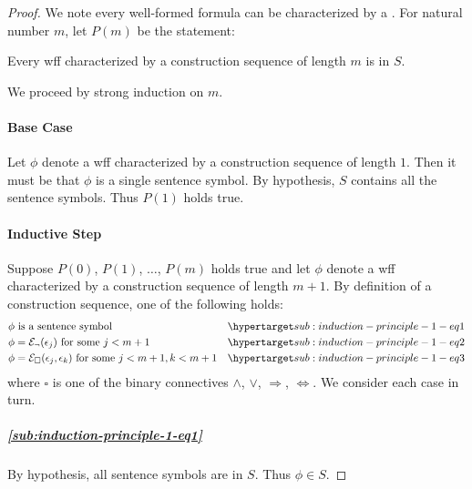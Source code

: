 \documentclass{report}
\begin{document}
  \begin{proof}
    We note every well-formed formula can be characterized by a
      .
    For natural number $m$, let $P(m)$ be the statement:
      \begin{induction}
        Every wff characterized by a construction sequence of length $m$ is in
          $S$.
      \end{induction}
    \noindent
    We proceed by strong induction on $m$.

    \paragraph{Base Case}%

      Let $\phi$ denote a wff characterized by a construction sequence of length
        $1$.
      Then it must be that $\phi$ is a single sentence symbol.
      By hypothesis, $S$ contains all the sentence symbols.
      Thus $P(1)$ holds true.

    \paragraph{Inductive Step}%

      Suppose $P(0)$, $P(1)$, $\ldots$, $P(m)$ holds true and let $\phi$ denote
        a wff characterized by a construction sequence of length $m + 1$.
      By definition of a construction sequence, one of the following holds:
        \begin{align}
          & \phi \text{ is a sentence symbol}
            & \hyperlabel{sub:induction-principle-1-eq1} \\
          & \phi = \mathcal{E}_\neg(\epsilon_j)
            \text{ for some } j < m + 1
            & \hyperlabel{sub:induction-principle-1-eq2} \\
          & \phi = \mathcal{E}_\square(\epsilon_j, \epsilon_k)
            \text{ for some } j < m + 1, k < m + 1
            & \hyperlabel{sub:induction-principle-1-eq3}
        \end{align}
        where $\square$ is one of the binary connectives $\land$, $\lor$,
          $\Rightarrow$, $\Leftrightarrow$.
      We consider each case in turn.

      \subparagraph{\eqref{sub:induction-principle-1-eq1}}%

        By hypothesis, all sentence symbols are in $S$.
        Thus $\phi \in S$.


\end{proof}
\end{document}
